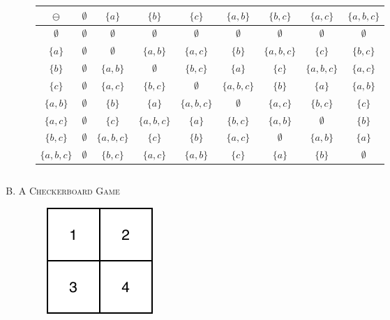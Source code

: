 \documentclass[twoside]{amsart}
\begin{document}
\begin{enumerate}[A.]
\begin{enumerate}[1.]
   \begin{center}
   \scalebox{.9}
   {\begin{tabular}{c|cccccccc}
      $\ominus$ & $\emptyset$ & $\{a\}$ & $\{b\}$ & $\{c\}$ & $\{a,b\}$ & 
          $\{b,c\}$ & $\{a,c\}$ & $\{a,b,c\}$  \\ \hline
      $\emptyset$ & $\emptyset$ & $\emptyset$ & $\emptyset$ & $\emptyset$ 
                  & $\emptyset$ & $\emptyset$ & $\emptyset$ & $\emptyset$\\
      $\{a\}$ & $\emptyset$ & $\emptyset$ & $\{a,b\}$ & $\{a,c\}$ & $\{b\}$ &
         $\{a,b,c\}$ & $\{c\}$ & $\{b,c\}$\\
      $\{b\}$ & $\emptyset$ & $\{a,b\}$ & $\emptyset$ & $\{b,c\}$ & $\{a\}$ &
         $\{c\}$ & $\{a,b,c\}$ & $\{a,c\}$ \\
      $\{c\}$ & $\emptyset$ & $\{a,c\}$ & $\{b,c\}$ & $\emptyset$ 
         & $\{a,b,c\}$ & $\{b\}$ & $\{a\}$ & $\{a,b\}$ \\
      $\{a,b\}$ & $\emptyset$ & $\{b\}$ & $\{a\}$ & $\{a,b,c\}$ & $\emptyset$ 
         & $\{a,c\}$ & $\{b,c\}$ & $\{c\}$ \\
      $\{a,c\}$ & $\emptyset$ & $\{c\}$ & $\{a,b,c\}$ & $\{a\}$ & $\{b,c\}$ 
         & $\{a,b\}$ & $\emptyset$ & $\{b\}$\\
      $\{b,c\}$ & $\emptyset$ & $\{a,b,c\}$ & $\{c\}$ & $\{b\}$ & $\{a,c\}$
         & $\emptyset$ & $\{a,b\}$ & $\{a\}$ \\
      $\{a,b,c\}$ & $\emptyset$ & $\{b,c\}$ & $\{a,c\}$ & $\{a,b\}$ & $\{c\}$ 
         & $\{a\}$ & $\{b\}$ & $\emptyset$\\
   \end{tabular}}
   \end{center}
   
   \begin{verbatim}

   \end{verbatim}

   \end{enumerate}

   \item \textsc{A Checkerboard Game}
      \begin{figure}[ht]
      \includegraphics{img/checker.pdf}
   \end{figure}


\end{enumerate}
\end{document}
